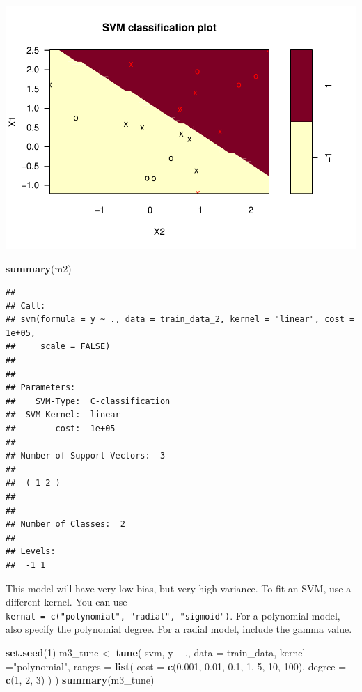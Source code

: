 \documentclass[
]{book}
\newenvironment{Shaded}{\begin{snugshade}}{\end{snugshade}}
\newcommand{\DataTypeTok}[1]{\textcolor[rgb]{0.13,0.29,0.53}{#1}}
\newcommand{\DecValTok}[1]{\textcolor[rgb]{0.00,0.00,0.81}{#1}}
\newcommand{\FloatTok}[1]{\textcolor[rgb]{0.00,0.00,0.81}{#1}}
\newcommand{\KeywordTok}[1]{\textcolor[rgb]{0.13,0.29,0.53}{\textbf{#1}}}
\newcommand{\NormalTok}[1]{#1}
\newcommand{\OperatorTok}[1]{\textcolor[rgb]{0.81,0.36,0.00}{\textbf{#1}}}
\newcommand{\StringTok}[1]{\textcolor[rgb]{0.31,0.60,0.02}{#1}}
\begin{document}
\includegraphics{data-sci_files/figure-latex/unnamed-chunk-126-1.pdf}

\begin{Shaded}
\begin{Highlighting}[]
\KeywordTok{summary}\NormalTok{(m2)}
\end{Highlighting}
\end{Shaded}

\begin{verbatim}
## 
## Call:
## svm(formula = y ~ ., data = train_data_2, kernel = "linear", cost = 1e+05, 
##     scale = FALSE)
## 
## 
## Parameters:
##    SVM-Type:  C-classification 
##  SVM-Kernel:  linear 
##        cost:  1e+05 
## 
## Number of Support Vectors:  3
## 
##  ( 1 2 )
## 
## 
## Number of Classes:  2 
## 
## Levels: 
##  -1 1
\end{verbatim}

This model will have very low bias, but very high variance. To fit an SVM, use a different kernel. You can use \texttt{kernal\ =\ c("polynomial",\ "radial",\ "sigmoid")}. For a polynomial model, also specify the polynomial degree. For a radial model, include the gamma value.

\begin{Shaded}
\begin{Highlighting}[]
\KeywordTok{set.seed}\NormalTok{(}\DecValTok{1}\NormalTok{)}
\NormalTok{m3_tune <-}\StringTok{ }\KeywordTok{tune}\NormalTok{(}
\NormalTok{  svm,}
\NormalTok{  y }\OperatorTok{~}\StringTok{ }\NormalTok{.,}
  \DataTypeTok{data =}\NormalTok{ train_data,}
  \DataTypeTok{kernel =}\StringTok{"polynomial"}\NormalTok{,}
  \DataTypeTok{ranges =} \KeywordTok{list}\NormalTok{(}
    \DataTypeTok{cost =} \KeywordTok{c}\NormalTok{(}\FloatTok{0.001}\NormalTok{, }\FloatTok{0.01}\NormalTok{, }\FloatTok{0.1}\NormalTok{, }\DecValTok{1}\NormalTok{, }\DecValTok{5}\NormalTok{, }\DecValTok{10}\NormalTok{, }\DecValTok{100}\NormalTok{),}
    \DataTypeTok{degree =} \KeywordTok{c}\NormalTok{(}\DecValTok{1}\NormalTok{, }\DecValTok{2}\NormalTok{, }\DecValTok{3}\NormalTok{)}
\NormalTok{  )}
\NormalTok{)}
\KeywordTok{summary}\NormalTok{(m3_tune)}
\end{Highlighting}
\end{Shaded}
\end{document}
